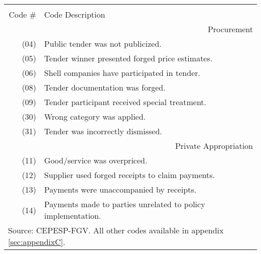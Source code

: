 \documentclass[border = 1pt]{standalone}
\begin{document}
\scriptsize
\begin{tabular}{r|l}
\hline
\hline \\[-1.8ex]
Code \# & Code Description                                          \\[1.0ex]
\hline
\multicolumn{2}{r}{Procurement}                                     \\
\hline
(04) & Public tender was not publicized.                            \\[1.0ex]
(05) & Tender winner presented forged price estimates.              \\[1.0ex]
(06) & Shell companies have participated in tender.                 \\[1.0ex]
(08) & Tender documentation was forged.                             \\[1.0ex]
(09) & Tender participant received special treatment.               \\[1.0ex]
(30) & Wrong category was applied.                                  \\[1.0ex]
(31) & Tender was incorrectly dismissed.                            \\[1.0ex]
\hline
\multicolumn{2}{r}{Private Appropriation}                           \\
\hline
(11) & Good/service was overpriced.                                 \\[1.0ex]
(12) & Supplier used forged receipts to claim payments.             \\[1.0ex]
(13) & Payments were unaccompanied by receipts.                     \\[1.0ex]
(14) & Payments made to parties unrelated to policy implementation. \\[1.0ex]
\hline
\hline
\multicolumn{2}{l}{Source: CEPESP-FGV. All other codes available in appendix \ref{sec:appendixC}.}
\end{tabular}
\end{document}
